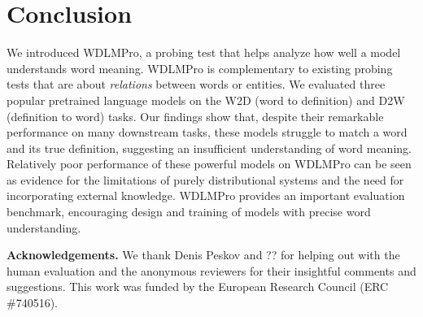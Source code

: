 \documentclass[11pt,a4paper]{article}
\begin{document}
\section{Conclusion}
We introduced
WDLMPro,
a
probing test that helps  analyze  how well a model
understands word meaning. WDLMPro is complementary to existing
probing tests that are about
\emph{relations} between words or entities.
We evaluated three popular pretrained language
models on the W2D (word to definition) and D2W (definition
to word) tasks. Our findings show
that, despite their remarkable performance on many
downstream tasks, these models struggle to match a word and
its true definition, suggesting an insufficient
understanding of word meaning.
Relatively poor performance of these
powerful models on WDLMPro can be seen as evidence
for the limitations of purely distributional systems and
the need for incorporating external knowledge.
WDLMPro provides an important
evaluation benchmark, encouraging design and training of
models with precise word understanding.

\textbf{Acknowledgements.} We thank Denis Peskov and ?? for
helping out with the human evaluation and
the anonymous reviewers for their insightful comments and suggestions.
This work was funded by the European Research Council (ERC \#740516).






   
\end{document}
